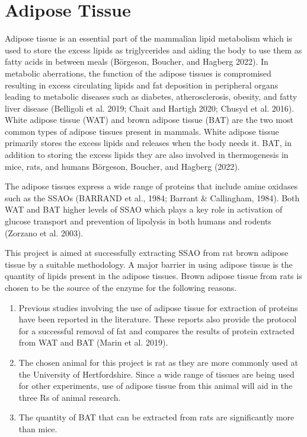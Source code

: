\documentclass[
  letterpaper,
  DIV=11,
  numbers=noendperiod]{scrreprt}
\providecommand{\tightlist}{%
  \setlength{\itemsep}{0pt}\setlength{\parskip}{0pt}}\usepackage{longtable,booktabs,array}
\begin{document}
\section{\texorpdfstring{\textbf{Adipose
Tissue}}{Adipose Tissue}}\label{adipose-tissue}

Adipose tissue is an essential part of the mammalian lipid metabolism
which is used to store the excess lipids as triglycerides and aiding the
body to use them as fatty acids in between meals (Börgeson, Boucher, and
Hagberg 2022). In metabolic aberrations, the function of the adipose
tissues is compromised resulting in excess circulating lipids and fat
deposition in peripheral organs leading to metabolic diseases such as
diabetes, atherosclerosis, obesity, and fatty liver disease (Belligoli
et al. 2019; Chait and Hartigh 2020; Chusyd et al. 2016). White adipose
tissue (WAT) and brown adipose tissue (BAT) are the two most common
types of adipose tissues present in mammals. White adipose tissue
primarily stores the excess lipids and releases when the body needs it.
BAT, in addition to storing the excess lipids they are also involved in
thermogenesis in mice, rats, and humans Börgeson, Boucher, and Hagberg
(2022).

The adipose tissues express a wide range of proteins that include amine
oxidases such as the SSAOs (BARRAND et al., 1984; Barrant \& Callingham,
1984). Both WAT and BAT higher levels of SSAO which plays a key role in
activation of glucose transport and prevention of lipolysis in both
humans and rodents (Zorzano et al. 2003).

This project is aimed at successfully extracting SSAO from rat brown
adipose tissue by a suitable methodology. A major barrier in using
adipose tissue is the quantity of lipids present in the adipose tissues.
Brown adipose tissue from rats is chosen to be the source of the enzyme
for the following reasons.

\begin{enumerate}
\def\labelenumi{\arabic{enumi}.}
\tightlist
\item
  Previous studies involving the use of adipose tissue for extraction of
  proteins have been reported in the literature. These reports also
  provide the protocol for a successful removal of fat and compares the
  results of protein extracted from WAT and BAT (Marin et al. 2019).
\item
  The chosen animal for this project is rat as they are more commonly
  used at the University of Hertfordshire. Since a wide range of tissues
  are being used for other experiments, use of adipose tissue from this
  animal will aid in the three Rs of animal research.
\item
  The quantity of BAT that can be extracted from rats are significantly
  more than mice.
\end{enumerate}
\end{document}

